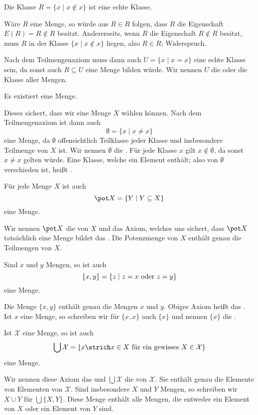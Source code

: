 \begin{lem}
Die Klasse $R=\{x\mid x\notin x\}$ ist eine echte Klasse.
\begin{bew}
Wäre $R$ eine Menge, so würde aus $R\in R$ folgen, dass $R$ die Eigenschaft $E(R)=R\notin R$ besitzt. Andererseits, wenn $R$ die Eigenschaft $R\notin R$ besitzt, muss $R$ in der Klasse $\{x\mid x\notin x\}$ liegen, also $R\in R$; Widerspruch.
\end{bew}
\end{lem}

Nach dem Teilmengenaxiom muss dann auch $U=\{x\mid x=x\}$ eine echte Klasse sein, da sonst auch $R\subseteq U$ eine Menge bilden würde. Wir nennen $U$ die  oder die Klasse aller Mengen.

\begin{axiom}
Es existiert eine Menge.
\end{axiom}

Dieses  sichert, dass wir eine Menge $X$ wählen können. Nach dem Teilmengenaxiom ist dann auch
\[\emptyset=\{x\mid x\not= x\}\] eine Menge, da $\emptyset$ offensichtlich Teilklasse jeder Klasse und insbesondere Teilmenge von $X$ ist. Wir nennen $\emptyset$ die . Für jede Klasse $x$ gilt $x\notin\emptyset$, da sonst $x\not= x$ gelten würde. Eine Klasse, welche ein Element enthält; also von $\emptyset$ verschieden ist, heißt .

\begin{axiom}
Für jede Menge $X$ ist auch
\[
\pot X=\{Y\mid Y\subseteq X\}
\]
eine Menge.
\end{axiom}
Wir nennen $\pot X$ die  von $X$ und das Axiom, welches uns sichert, dass $\pot X$ tatsächlich eine Menge bildet das . Die Potenzmenge von $X$ enthält genau die Teilmengen von $X$.

\begin{axiom}
Sind $x$ und $y$ Mengen, so ist auch
\[
\{x,y\}=\{z\mid z=x\textnormal{ oder }z=y\}\]
eine Menge.
\end{axiom}
Die Menge $\{x,y\}$ enthält genau die Mengen $x$ und $y$. Obiges Axiom heißt das . Ist $x$ eine Menge, so schreiben wir für $\{x,x\}$ auch $\{x\}$ und nennen $\{x\}$ die .

\begin{axiom}
Ist $\mathcal{X}$ eine Menge, so ist auch
\[
\bigcup\mathcal{X}=\left\{x\strich x\in X\textnormal{ für ein gewisses }X\in\mathcal{X}\right\}
\]
eine Menge.
\end{axiom}
Wir nennen diese Axiom das  und $\bigcup\mathcal{X}$ die  von $\mathcal{X}$. Sie enthält genau die Elemente von Elementen von $\mathcal{X}$. Sind insbesondere $X$ und $Y$ Mengen, so schreiben wir $X\cup Y$ für $\bigcup\{X,Y\}$. Diese Menge enthält alle Mengen, die entweder ein Element von $X$ oder ein Element von $Y$ sind.

